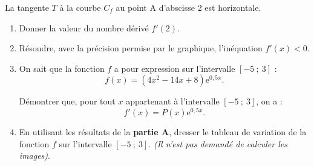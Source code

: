\documentclass[10pt]{article}
\providecommand{\e}{{\mathrm{e}}}
\begin{document}
La tangente $T$ à la courbe $C_f$ au point A d'abscisse 2 est horizontale.

\begin{enumerate}
\item Donner la valeur du nombre dérivé $f'(2)$.

\item Résoudre, avec la précision permise par le graphique, l'inéquation $f'(x) < 0$.

\item On sait que la fonction $f$ a pour expression sur l'intervalle $[-5~;~3]$ :
\[f(x) = (4x^2 - 14x + 8)\e^{0,5x}.\]

Démontrer que, pour tout $x$ appartenant à l'intervalle $[-5~;~3]$, on a :
\[f'(x) = P(x)\e^{0,5x}.\]

\item En utilisant les résultats de la \textbf{partie A}, dresser le tableau de variation de la fonction $f$ sur l'intervalle $[-5~;~3]$. \textit{(Il n'est pas demandé de calculer les images)}.
\end{enumerate}
\end{document}
